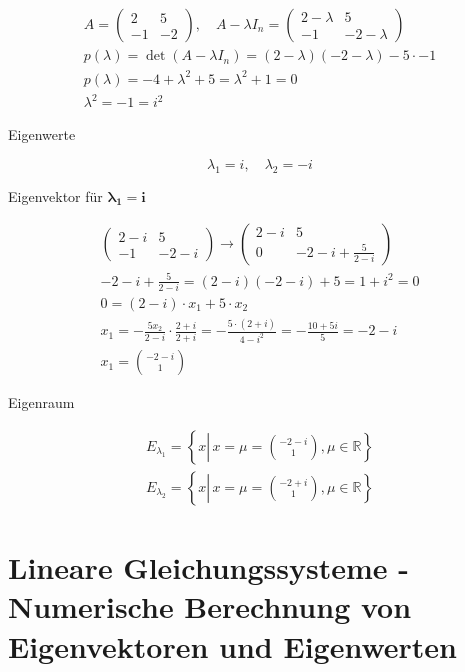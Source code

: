 \documentclass[10pt]{article}
\begin{document}
$$
\begin{gathered}
A=\left(\begin{array}{cc}
2 & 5 \\
-1 & -2
\end{array}\right), \quad A-\lambda I_{n}=\left(\begin{array}{cc}
2-\lambda & 5 \\
-1 & -2-\lambda
\end{array}\right) \\
p(\lambda)=\operatorname{det}\left(A-\lambda I_{n}\right)=(2-\lambda)(-2-\lambda)-5 \cdot-1 \\
p(\lambda)=-4+\lambda^{2}+5=\lambda^{2}+1=0 \\
\lambda^{2}=-1=i^{2}
\end{gathered}
$$

Eigenwerte

$$
\lambda_{1}=i, \quad \lambda_{2}=-i
$$

Eigenvektor für $\boldsymbol{\lambda}_{\mathbf{1}}=\boldsymbol{i}$

$$
\begin{gathered}
\left(\begin{array}{cc}
2-i & 5 \\
-1 & -2-i
\end{array}\right) \rightarrow\left(\begin{array}{cc}
2-i & 5 \\
0 & -2-i+\frac{5}{2-i}
\end{array}\right) \\
-2-i+\frac{5}{2-i}=(2-i)(-2-i)+5=1+i^{2}=0 \\
0=(2-i) \cdot x_{1}+5 \cdot x_{2} \\
x_{1}=-\frac{5 x_{2}}{2-i} \cdot \frac{2+i}{2+i}=-\frac{5 \cdot(2+i)}{4-i^{2}}=-\frac{10+5 i}{5}=-2-i \\
x_{1}=\binom{-2-i}{1}
\end{gathered}
$$

Eigenraum

$$
\begin{gathered}
E_{\lambda_{1}}=\left\{x \left\lvert\, x=\mu=\binom{-2-i}{1}\right., \mu \in \mathbb{R}\right\} \\
E_{\lambda_{2}}=\left\{x \left\lvert\, x=\mu=\binom{-2+i}{1}\right., \mu \in \mathbb{R}\right\}
\end{gathered}
$$

\section*{Lineare Gleichungssysteme - Numerische Berechnung von Eigenvektoren und Eigenwerten}
\end{document}
